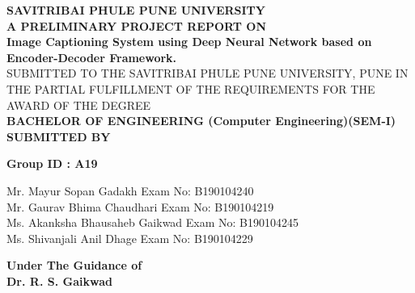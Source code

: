 \documentclass[oneside,a4paper,12pt]{report}
\begin{document}
\setlength{\parindent}{0mm}
\begin{center}
{\bfseries SAVITRIBAI PHULE PUNE UNIVERSITY \\}
 \vspace*{1\baselineskip}
{\bfseries A PRELIMINARY PROJECT REPORT ON \\}
 \vspace*{1\baselineskip}
{\bfseries \fontsize{16}{12} \selectfont Image Captioning System using Deep Neural Network based on Encoder-Decoder Framework. \\\vspace*{1\baselineskip}}
{\fontsize{12}{12} \selectfont SUBMITTED TO THE SAVITRIBAI PHULE PUNE UNIVERSITY, PUNE
IN THE PARTIAL FULFILLMENT OF THE REQUIREMENTS 
FOR THE AWARD OF THE DEGREE \\
\vspace*{2\baselineskip}}
{\bfseries \fontsize{14}{12} \selectfont 
\hspace{18 mm}BACHELOR OF ENGINEERING
\newline(Computer Engineering)(SEM-I) \\
\vspace*{1\baselineskip}} 
{\bfseries \fontsize{14}{12} \selectfont SUBMITTED BY \\ 
} 
\begin{center}
\bf{Group ID : A19}
\end{center}
\begin{flushleft}
\hspace{15mm}Mr. Mayur Sopan  Gadakh   \hspace{31 mm} Exam No: B190104240  \\
\hspace{15mm}Mr. Gaurav Bhima Chaudhari  \hspace{25 mm} Exam No: B190104219   \\
\hspace{15mm}Ms. Akanksha Bhausaheb Gaikwad   \hspace{15 mm} Exam No: B190104245 \\
\hspace{15mm}Ms. Shivanjali Anil Dhage \hspace{30 mm} Exam No: B190104229\\
\end{flushleft}
\vspace*{1\baselineskip}
{\bfseries \fontsize{14}{12} \selectfont Under The Guidance of \\  
\vspace*{2mm}} 
\bf{Dr. R. S. Gaikwad}\\

\end{center}
\end{document}
